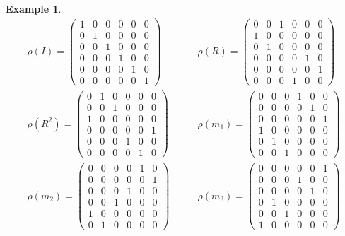 \documentclass{article}
\theoremstyle{plain}\theoremheaderfont{\normalfont\itshape}\theorembodyfont{\rmfamily}\theoremseparator{.}\newtheorem*{rem}{Remark}\newtheorem*{ex}{Example}\newtheorem*{proof}{Proof}\newtheorem*{altp}{Alternative proof}
\theoremstyle{plain}\theoremheaderfont{\normalfont\bfseries}\theorembodyfont{\rmfamily}\theoremseparator{.}\newtheorem{thm}{Theorem}[section]\newtheorem{lem}[thm]{Lemma}\newtheorem{prop}[thm]{Proposition}\newtheorem*{cor}{Corollary}\newtheorem{defn}[thm]{Definition}\newtheorem{clm}[thm]{Claim}\newtheorem{clminproof}{Claim}
\theoremstyle{break}\theoremheaderfont{\normalfont\itshape}\theorembodyfont{\rmfamily}\theoremseparator{.\medskip}\newtheorem*{proofskip}{Proof}\newtheorem*{exs}{Examples}\newtheorem*{rems}{Remarks}
\theoremstyle{break}\theoremheaderfont{\normalfont\bfseries}\theorembodyfont{\rmfamily}\theoremseparator{.\medskip}\newtheorem{lemskip}[thm]{Lemma}\newtheorem{defnskip}[thm]{Definition}\newtheorem{propskip}[thm]{Proposition}\newtheorem{thmskip}[thm]{Theorem}
\numberwithin{equation}{section}
\begin{document}
\begin{ex}
		\begin{align*}
			\rho(I)=\begin{pmatrix}
				1 & 0 & 0 & 0 & 0 & 0\\
				0 & 1 & 0 & 0 & 0 & 0\\
				0 & 0 & 1 & 0 & 0 & 0\\
				0 & 0 & 0 & 1 & 0 & 0\\
				0 & 0 & 0 & 0 & 1 & 0\\
				0 & 0 & 0 & 0 & 0 & 1
			\end{pmatrix}\qquad & \rho(R)=\begin{pmatrix}
				0 & 0 & 1 & 0 & 0 & 0\\
				1 & 0 & 0 & 0 & 0 & 0\\
				0 & 1 & 0 & 0 & 0 & 0\\
				0 & 0 & 0 & 0 & 1 & 0\\
				0 & 0 & 0 & 0 & 0 & 1\\
				0 & 0 & 0 & 1 & 0 & 0
			\end{pmatrix} \\
			\rho(R^2)=\begin{pmatrix}
				0 & 1 & 0 & 0 & 0 & 0\\
				0 & 0 & 1 & 0 & 0 & 0\\
				1 & 0 & 0 & 0 & 0 & 0\\
				0 & 0 & 0 & 0 & 0 & 1\\
				0 & 0 & 0 & 1 & 0 & 0\\
				0 & 0 & 0 & 0 & 1 & 0
			\end{pmatrix}\qquad & \rho(m_1)=\begin{pmatrix}
				0 & 0 & 0 & 1 & 0 & 0\\
				0 & 0 & 0 & 0 & 1 & 0\\
				0 & 0 & 0 & 0 & 0 & 1\\
				1 & 0 & 0 & 0 & 0 & 0\\
				0 & 1 & 0 & 0 & 0 & 0\\
				0 & 0 & 1 & 0 & 0 & 0
			\end{pmatrix} \\
			\rho(m_2)=\begin{pmatrix}
				0 & 0 & 0 & 0 & 1 & 0\\
				0 & 0 & 0 & 0 & 0 & 1\\
				0 & 0 & 0 & 1 & 0 & 0\\
				0 & 0 & 1 & 0 & 0 & 0\\
				1 & 0 & 0 & 0 & 0 & 0\\
				0 & 1 & 0 & 0 & 0 & 0
			\end{pmatrix}\qquad & \rho(m_3)=\begin{pmatrix}
				0 & 0 & 0 & 0 & 0 & 1\\
				0 & 0 & 0 & 1 & 0 & 0\\
				0 & 0 & 0 & 0 & 1 & 0\\
				0 & 1 & 0 & 0 & 0 & 0\\
				0 & 0 & 1 & 0 & 0 & 0\\
				1 & 0 & 0 & 0 & 0 & 0
			\end{pmatrix}
		\end{align*}


\end{ex}
\end{document}
